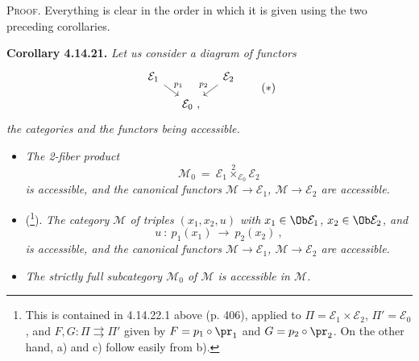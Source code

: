 \textsc{Proof}. Everything is clear in the order in which it is given using the two preceding corollaries.

\textbf{Corollary 4.14.21.} \textit{Let us consider a diagram of functors}
\[
\begin{tikzcd}[column sep=small, row sep=small]
\mathcal{E}_1 \arrow[dr, "p_1"] & & \mathcal{E}_2 \arrow[dl, "p_2"'] \\
& \mathcal{E}_0 \ , &
\end{tikzcd}
\tag*{$(*)$}
\]
\textit{the categories and the functors being accessible.}

\begin{itemize}[leftmargin=2.5em]
\item[\textit{a)}] \textit{The 2-fiber product}
\[
\mathcal{M}_0 \ = \ \mathcal{E}_1 \overset{2}{\times}_{\mathcal{E}_0} \mathcal{E}_2
\]
\textit{is accessible, and the canonical functors $\mathcal{M} \longrightarrow \mathcal{E}_1$, $\mathcal{M} \longrightarrow \mathcal{E}_2$ are accessible.} %
\item[\textit{b)}] (\footnote[169]{This is contained in 4.14.22.1 above (p. 406), applied to $\Pi = \mathcal{E}_1{\times}\mathcal{E}_2$, $\Pi' = \mathcal{E}_0$, and $F, G : \Pi \rightrightarrows \Pi'$ given by $F = p_1\circ\pr_1$ and $G = p_2\circ\pr_2$. On the other hand, a) and c) follow easily from b).}). \textit{The category $\mathcal{M}$ of triples $(x_1,x_2,u)$ with $x_1 \in \Ob\mathcal{E}_1$, $x_2 \in \Ob\mathcal{E}_2$, and}
\[
u \ : \ p_1(x_1) \ \longrightarrow \ p_2(x_2) \ ,
\]
\textit{is accessible, and the canonical functors $\mathcal{M} \longrightarrow \mathcal{E}_1$, $\mathcal{M} \longrightarrow \mathcal{E}_2$ are accessible.}
\item[\textit{c)}] \textit{The strictly full subcategory $\mathcal{M}_0$ of $\mathcal{M}$ is accessible in $\mathcal{M}$.}
\end{itemize}

